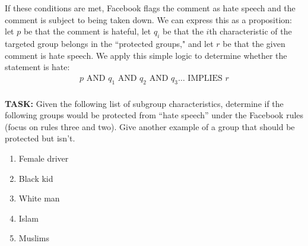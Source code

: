 \documentclass[12pt,letterpaper]{article}
\newif\ifsol
\newcommand{\solu}[2]{ \begin{mdframed} \ifsol #2 \else \vspace{#1} \fi \end{mdframed} }
\begin{document}
    If these conditions are met, Facebook flags the comment as hate speech and the comment is subject to being taken down. We can express this as a proposition: let $p$ be that the comment is hateful, let $q_i$ be that the $i$th characteristic of the targeted group belongs in the “protected groups," and let $r$ be that the given comment is hate speech. We apply this simple logic to determine whether the statement is hate:
    \begin {align*}
    	p \text{ AND } q_1 \text{ AND } q_2 \text{ AND } q_3 … \text{ IMPLIES } r \\
    \end {align*}
    
    \newpage 
    \textbf{TASK:} Given the following list of subgroup characteristics, determine if the following groups would be protected from “hate speech” under the Facebook rules (focus on rules three and two). Give another example of a group that should be protected but isn’t.
    
    \begin{enumerate}[1.]
        \item Female driver
        \item Black kid
        \item White man
        \item Islam
        \item Muslims
    \end{enumerate}
    
    \solu{}{
    \begin{enumerate}[1.]
         \item “Female” is protected under sex; “driver” is not protected under occupation. “Female driver” is not protected.
        \item “Black” is protected under race; “kid” is not protected under age. “Black kid” is not protected.
        \item “White” is protected under race; “man” is protected under gender. “White man” is protected.
        \item “Islam” is not protected because comments are directed at the religion, instead of at people.
        \item “Muslims” is protected under religion.
    \end{enumerate}
    There are many other groups that should be protected but aren't. Students must generate a group that contains at least one descriptor not found in the “protected groups” list (race, sex, gender identity, religious affiliation, national origin, ethnicity, sexual orientation and serious disability/disease). Remember that Facebook uses colorblind rules, so “white” is just as protected as “black.”
    }
    
\end{document}
